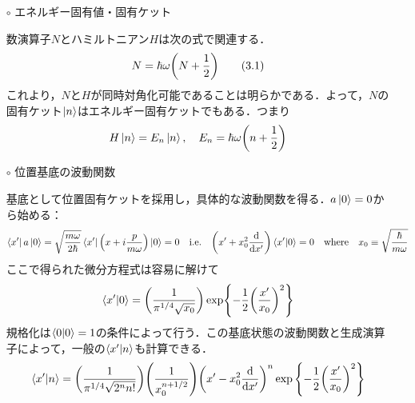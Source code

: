 \documentclass{jarticle}
\begin{document}
\begin{enumerate}
\begin{itemize}
  \item [$\circ$] エネルギー固有値・固有ケット

    数演算子$N$とハミルトニアン$H$は次の式で関連する．
    \begin{align}
      N = \hbar \omega \qty(N + \frac{1}{2}) \tag{3.1}
    \end{align}
    これより，$N$と$H$が同時対角化可能であることは明らかである．よって，$N$の固有ケット$\ket{n}$はエネルギー固有ケットでもある．つまり
    \begin{align}
      H\ket{n} = E_n\ket{n}, \quad E_n = \hbar \omega \qty(n + \frac{1}{2})
    \end{align}
  \item [$\circ$] 位置基底の波動関数

    基底として位置固有ケットを採用し，具体的な波動関数を得る．$a\ket{0} = 0$から始める：
    \begin{align}
      \bra{x'}a\ket{0} = \sqrt{\frac{m\omega}{2\hbar}} \bra{x'}\qty(x + i\frac{p}{m\omega})\ket{0} = 0 \quad \mathrm{i.e.} \quad \qty(x' + x_0^2\dv{x'})\bra{x'}\ket{0} = 0 \quad \mathrm{where} \quad x_0 \equiv \sqrt{\frac{\hbar}{m\omega}}
    \end{align}
    ここで得られた微分方程式は容易に解けて
    \begin{align}
      \bra{x'}\ket{0} = \qty(\frac{1}{\pi^{1/4}\sqrt{x_0}})\exp{-\frac{1}{2}\qty(\frac{x'}{x_0})^2}
    \end{align}
    規格化は$\bra{0}\ket{0} = 1$の条件によって行う．この基底状態の波動関数と生成演算子によって，一般の$\bra{x'}\ket{n}$も計算できる．
    \begin{align}
      \bra{x'}\ket{n} = \qty(\frac{1}{\pi^{1/4}\sqrt{2^nn!}})\qty(\frac{1}{x_0^{n + 1/2}})
      \qty(x' - x_0^2\dv{x'})^n \exp\qty{-\frac{1}{2}\qty(\frac{x'}{x_0})^2}
    \end{align}
    \item []
  \end{itemize}
\end{enumerate}
\end{document}
